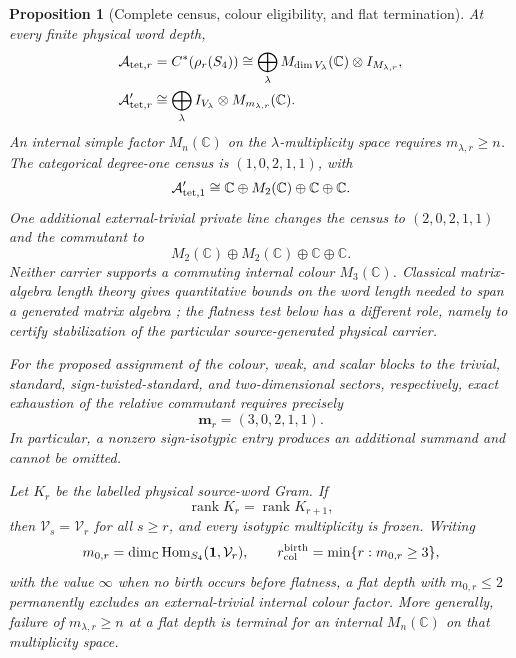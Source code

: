 \documentclass[11pt]{article}
\numberwithin{equation}{section}
\newtheorem{proposition}[theorem]{Proposition}
\theoremstyle{definition}
\theoremstyle{remark}
\newcommand{\C}{\mathbb C}
\newcommand{\rank}{\operatorname{rank}}
\newcommand{\Hom}{\operatorname{Hom}}
\newcommand{\A}{\mathcal A}
\begin{document}
\begin{proposition}[Complete census, colour eligibility, and flat termination]
\label{thm:active-isotypic}
At every finite physical word depth,
\begin{align}
 \A_{{\rm tet},r}&=C^*(\rho_r(S_4))
   \cong\bigoplus_\lambda M_{\dim V_\lambda}(\C)\otimes I_{M_{\lambda,r}},
 \label{eq:external-isotypic}\\
 \A_{{\rm tet},r}'&\cong\bigoplus_\lambda
   I_{V_\lambda}\otimes M_{m_{\lambda,r}}(\C).
 \label{eq:external-isotypic-commutant}
\end{align}
An internal simple factor $M_n(\C)$ on the $\lambda$-multiplicity space
requires $m_{\lambda,r}\ge n$.  The categorical degree-one census is
$(1,0,2,1,1)$, with
\begin{equation}
 \A_{{\rm tet},1}'\cong\C\oplus M_2(\C)\oplus\C\oplus\C.
 \label{eq:degree-one-commutant}
\end{equation}
One additional external-trivial private line changes the census to
$(2,0,2,1,1)$ and the commutant to
\begin{equation}
 M_2(\C)\oplus M_2(\C)\oplus\C\oplus\C.
 \label{eq:degree-one-private-commutant}
\end{equation}
Neither carrier supports a commuting internal colour $M_3(\C)$.
Classical matrix-algebra length theory gives quantitative bounds on the word
length needed to span a generated matrix algebra \cite{Shitov2019}; the
flatness test below has a different role, namely to certify stabilization of
the particular source-generated physical carrier.

For the proposed assignment of the colour, weak, and scalar blocks to the
trivial, standard, sign-twisted-standard, and two-dimensional sectors,
respectively, exact exhaustion of the relative commutant requires precisely
\begin{equation}
 \bm m_r=(3,0,2,1,1).
 \label{eq:SM-complete-census}
\end{equation}
In particular, a nonzero sign-isotypic entry produces an additional summand
and cannot be omitted.

Let $K_r$ be the labelled physical source-word Gram.  If
\begin{equation}
 \rank K_r=\rank K_{r+1},\label{eq:word-flatness}
\end{equation}
then $\mathcal V_s=\mathcal V_r$ for all $s\ge r$, and every isotypic
multiplicity is frozen.  Writing
\begin{equation}
 m_{0,r}=\dim_\C\Hom_{S_4}(\mathbf1,\mathcal V_r),\qquad
 r_{\rm col}^{\rm birth}=\min\{r:m_{0,r}\ge3\},
 \label{eq:colour-birth-depth}
\end{equation}
with the value $\infty$ when no birth occurs before flatness, a flat depth
with $m_{0,r}\le2$ permanently excludes an external-trivial internal colour
factor.  More generally, failure of $m_{\lambda,r}\ge n$ at a flat depth is
terminal for an internal $M_n(\C)$ on that multiplicity space.
\end{proposition}
\end{document}
